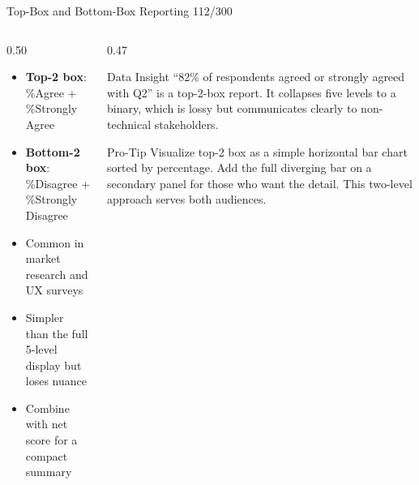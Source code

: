\documentclass[10pt]{beamer}
\newcommand{\smark}[1]{\hfill{\scriptsize\color{codegray}#1}}
\begin{document}
\begin{frame}{Top-Box and Bottom-Box Reporting}
\smark{112/300}
\begin{columns}[T]
\begin{column}{0.50\textwidth}
\begin{itemize}
    \item \textbf{Top-2 box}: \%Agree + \%Strongly Agree
    \item \textbf{Bottom-2 box}: \%Disagree + \%Strongly Disagree
    \item Common in market research and UX surveys
    \item Simpler than the full 5-level display but loses nuance
    \item Combine with net score for a compact summary
\end{itemize}
\end{column}
\begin{column}{0.47\textwidth}
\begin{exampleblock}{Data Insight}
    \scriptsize ``82\% of respondents agreed or strongly agreed with Q2'' is a top-2-box report. It collapses five levels to a binary, which is lossy but communicates clearly to non-technical stakeholders.
\end{exampleblock}
\vspace{0.1cm}
\begin{alertblock}{Pro-Tip}
    \scriptsize Visualize top-2 box as a simple horizontal bar chart sorted by percentage. Add the full diverging bar on a secondary panel for those who want the detail. This two-level approach serves both audiences.
\end{alertblock}
\end{column}
\end{columns}
\end{frame}
\end{document}
